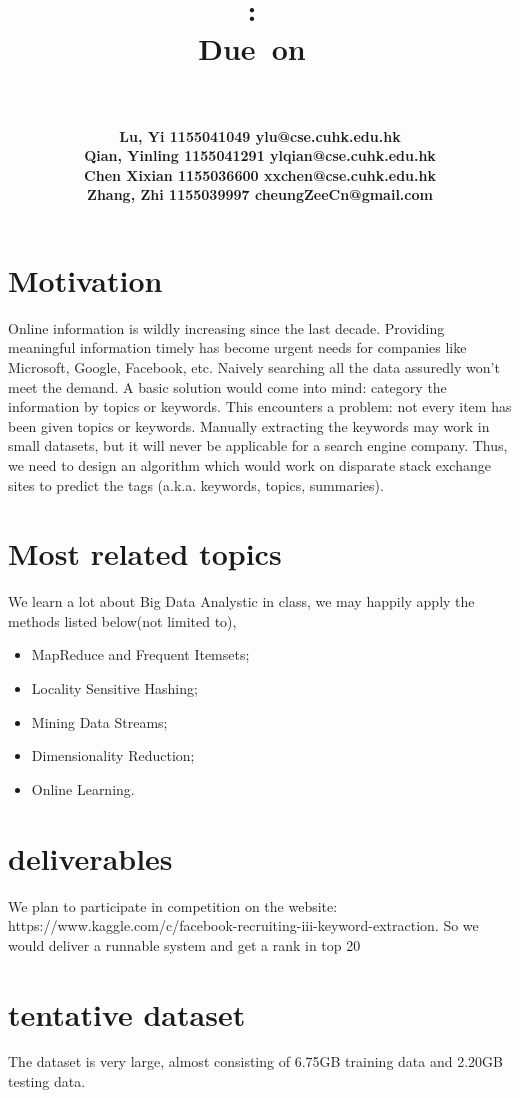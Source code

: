 \documentclass[11pt]{article} %
\title{
\vspace{2in}
\textmd{\textbf{\hmwkClass:\ \hmwkTitle}}\\
\normalsize\vspace{0.1in}\small{Due\ on\ \hmwkDueDate}\\
\vspace{0.1in}\large{\textit{\hmwkClassInstructor\ \hmwkClassTime}}
\vspace{3in}
}
\author{
\textbf{Lu, Yi 1155041049 ylu@cse.cuhk.edu.hk}  \\
\textbf{Qian, Yinling 1155041291 ylqian@cse.cuhk.edu.hk} \\
\textbf{Chen Xixian 1155036600 xxchen@cse.cuhk.edu.hk } \\
\textbf{Zhang, Zhi 1155039997 cheungZeeCn@gmail.com}
}
\date{} %
\begin{document}
\maketitle 
\thispagestyle{empty}

\newpage
{}

\section{Motivation}
Online information is wildly increasing since the last decade. Providing meaningful information timely has become urgent needs for companies like Microsoft, Google, Facebook, etc. Naively searching all the data assuredly won’t meet the demand. A basic solution would come into mind: category the information by topics or keywords. This encounters a problem: not every item has been given topics or keywords. Manually extracting the keywords may work in small datasets, but it will never be applicable for a search engine company. Thus, we need to design an algorithm which would work on disparate stack exchange sites to predict the tags (a.k.a. keywords, topics, summaries).


\section{Most related topics}
We learn a lot about Big Data Analystic in class, we may happily apply the methods listed below(not limited to),
\begin{itemize}
\item MapReduce and Frequent Itemsets;
\item Locality Sensitive Hashing;
\item Mining Data Streams;
\item Dimensionality Reduction;
\item Online Learning.
\end{itemize}
     
\section{deliverables}
We plan to participate in competition on the website: https://www.kaggle.com/c/facebook-recruiting-iii-keyword-extraction. So we would deliver a runnable system and get a rank in top 20

\section{ tentative dataset}
The dataset is very large, almost consisting of 6.75GB training data and 2.20GB testing data.
\end{document}

